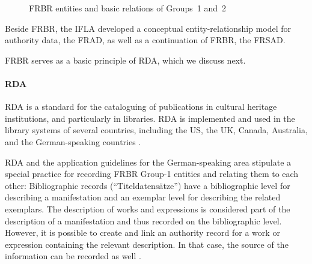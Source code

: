 \begin{figure}[ht]
  
  \caption[FRBR entities and basic relations of Groups~1 and~2]{\gls{FRBR} entities and basic relations of Groups~1 and~2 \autocite[following][]{FRBRpic1,FRBRpic2}}
  \label{fig:FRBR}
\end{figure}

Beside FRBR, the \gls{IFLA} developed
a conceptual entity-relationship model for authority data,
the \gls{FRAD},
as well as a continuation of FRBR,
the \gls{FRSAD}.

FRBR serves as a basic principle of RDA, which we discuss next.

\paragraph{RDA}

\gls{RDA} is a standard for the cataloguing of publications
in cultural heritage institutions, and particularly in libraries.
RDA is implemented and used in the library systems of several countries, including
the US, the UK, Canada, Australia, and the German-speaking countries
\autocite{WikiDE_RDA}.

RDA and the application guidelines for the German-speaking area
stipulate a special practice for recording FRBR Group-1 entities and relating 
them to each other: Bibliographic records (\enquote{Titel\-daten\-sätze})
have a bibliographic level for describing a manifestation
and an exemplar level for describing the related exemplars. The description of works and expressions
is considered part of the description of a manifestation and thus recorded on the bibliographic level.
However, it is possible to create and link an authority record for a work or expression
containing the relevant description. In that case, the source of the information can be recorded as well
\autocite[cf.][§5.1]{Wiesenmueller2015}.

